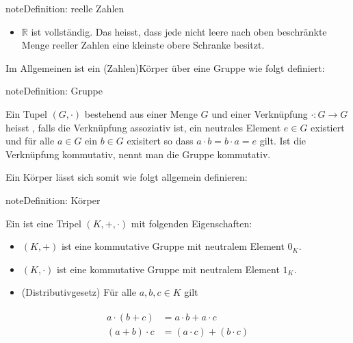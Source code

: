 \documentclass[letterpaper,10pt,english]{jupyterBook}
\begin{document}
\begin{sphinxadmonition}{note}{Definition: reelle Zahlen}
\begin{itemize}
\begin{itemize}
\item {} 
Die Ordnung ist verträglich mit Addition und Multiplikation, d.h. für \(a,b,c\in\mathbb{R}\) gilt

\end{itemize}
\begin{equation*}
\begin{split}\begin{array}{c}
  a \le b \Rightarrow a+c \le b+c\\
  a \le b, 0 \le c \Rightarrow a\cdot c \le b\cdot c
  \end{array}\end{split}
\end{equation*}
\item {} 
\(\mathbb{R}\) ist vollständig. Das heisst, dass jede nicht leere nach oben beschränkte Menge reeller Zahlen eine kleinste obere Schranke besitzt.

\end{itemize}
\end{sphinxadmonition}

Im Allgemeinen ist ein (Zahlen)\sphinxhyphen{}Körper über eine Gruppe wie folgt definiert:

\begin{sphinxadmonition}{note}{Definition: Gruppe}

Ein Tupel \((G, \cdot)\) bestehend aus einer Menge \(G\) und einer Verknüpfung \(\cdot : G \to G\) heisst , falls die Verknüpfung assoziativ ist, ein neutrales Element \(e\in G\) existiert und für alle \(a \in G\) ein \(b\in G\) exisitert so dass \(a\cdot b = b\cdot a = e\) gilt. Ist die Verknüpfung kommutativ, nennt man die Gruppe kommutativ.
\end{sphinxadmonition}

Ein Körper lässt sich somit wie folgt allgemein definieren:

\begin{sphinxadmonition}{note}{Definition: Körper}

Ein  ist eine Tripel \((K, +, \cdot)\) mit folgenden Eigenschaften:
\begin{itemize}
\item {} 
\((K, +)\) ist eine kommutative Gruppe mit neutralem Element \(0_K\).

\item {} 
\((K, \cdot)\) ist eine kommutative Gruppe mit neutralem Element \(1_K\).

\item {} 
(Distributivgesetz) Für alle \(a,b,c\in K\) gilt

\end{itemize}
\begin{equation*}
\begin{split}\begin{split}a\cdot (b+c) & = a\cdot b + a\cdot c\\
(a+b)\cdot c & = (a\cdot c) + (b\cdot c)\end{split}\end{split}
\end{equation*}\end{sphinxadmonition}
\end{document}
